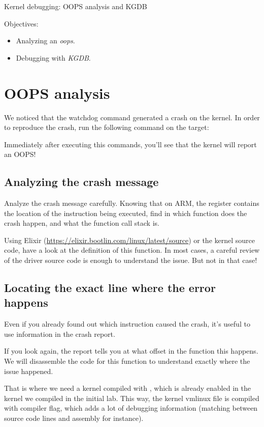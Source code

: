 \subchapter
{Kernel debugging: OOPS analysis and KGDB}
{Objectives:
  \begin{itemize}
	  \item Analyzing an {\em oops}.
	  \item Debugging with {\em KGDB}.
  \end{itemize}
}

\section{OOPS analysis}
We noticed that the watchdog command generated a crash on the kernel. In order
to reproduce the crash, run the following command on the target:


Immediately after executing this commands, you'll see that the kernel will report
an OOPS!

\subsection{Analyzing the crash message}

Analyze the crash message carefully. Knowing that on ARM, the 
register contains the location of the instruction being executed, find
in which function does the crash happen, and what the function call
stack is.

Using Elixir (\url{https://elixir.bootlin.com/linux/latest/source}) or the
kernel source code, have a look at the definition of this function. In most
cases, a careful review of the driver source code is enough to understand the
issue. But not in that case!

\subsection{Locating the exact line where the error happens}

Even if you already found out which instruction caused the crash, it's
useful to use information in the crash report.

If you look again, the report tells you at what offset in the function
this happens. We will disassemble the code for this function to understand
exactly where the issue happened.

That is where we need a kernel compiled with ,
which is already enabled in the kernel we compiled in the initial lab.
This way, the kernel vmlinux file is compiled with  compiler flag,
which adds a lot of debugging information (matching between source code
lines and assembly for instance).

